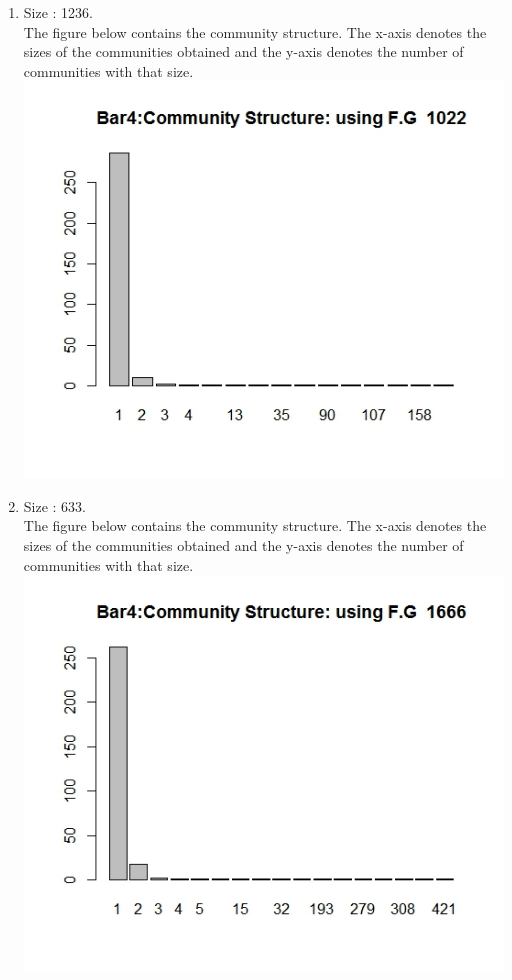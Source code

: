 \documentclass{article}
\begin{document}
\begin{enumerate}
 \item 
 Size : 1236.\\
 The figure below contains the community structure. The x-axis denotes the sizes of the communities obtained
 and the y-axis denotes the number of communities with that size.\\
 \includegraphics[scale=0.4]{p13}
 
 \item 
 Size : 633.\\
 The figure below contains the community structure. The x-axis denotes the sizes of the communities obtained
 and the y-axis denotes the number of communities with that size.\\
 \includegraphics[scale=0.4]{p14}
 

\end{enumerate}
\end{document}
